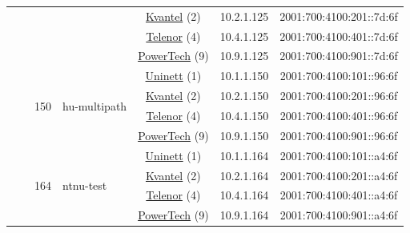 \begin{small}
\begin{center}
\begin{longtable}{|c|c|c|c|c|c|c|c|}
  &  &  &  & \multicolumn{2}{|c|}{\tiny{\href{http://kvantel.no}{Kvantel} (2)}} & \tiny{10.2.1.125} & \tiny{2001:700:4100:201::7d:6f} \\* \cline{5-5}\cline{6-6}\cline{7-7}\cline{8-8}
  &  &  &  & \multicolumn{2}{|c|}{\tiny{\href{https://www.telenor.no}{Telenor} (4)}} & \tiny{10.4.1.125} & \tiny{2001:700:4100:401::7d:6f} \\* \cline{5-5}\cline{6-6}\cline{7-7}\cline{8-8}
  &  &  &  & \multicolumn{2}{|c|}{\tiny{\href{http://www.powertech.no}{PowerTech} (9)}} & \tiny{10.9.1.125} & \tiny{2001:700:4100:901::7d:6f} \\* \cline{3-3}\cline{4-4}\cline{5-5}\cline{6-6}\cline{7-7}\cline{8-8}
  &  & \multirow{4}{*}{\tiny{150}} & \multicolumn{1}{|l|}{\multirow{4}{*}{\tiny{hu-multipath}}} & \multicolumn{2}{|c|}{\tiny{\href{https://www.uninett.no}{Uninett} (1)}} & \tiny{10.1.1.150} & \tiny{2001:700:4100:101::96:6f} \\* \cline{5-5}\cline{6-6}\cline{7-7}\cline{8-8}
  &  &  &  & \multicolumn{2}{|c|}{\tiny{\href{http://kvantel.no}{Kvantel} (2)}} & \tiny{10.2.1.150} & \tiny{2001:700:4100:201::96:6f} \\* \cline{5-5}\cline{6-6}\cline{7-7}\cline{8-8}
  &  &  &  & \multicolumn{2}{|c|}{\tiny{\href{https://www.telenor.no}{Telenor} (4)}} & \tiny{10.4.1.150} & \tiny{2001:700:4100:401::96:6f} \\* \cline{5-5}\cline{6-6}\cline{7-7}\cline{8-8}
  &  &  &  & \multicolumn{2}{|c|}{\tiny{\href{http://www.powertech.no}{PowerTech} (9)}} & \tiny{10.9.1.150} & \tiny{2001:700:4100:901::96:6f} \\* \cline{3-3}\cline{4-4}\cline{5-5}\cline{6-6}\cline{7-7}\cline{8-8}
  &  & \multirow{4}{*}{\tiny{164}} & \multicolumn{1}{|l|}{\multirow{4}{*}{\tiny{ntnu-test}}} & \multicolumn{2}{|c|}{\tiny{\href{https://www.uninett.no}{Uninett} (1)}} & \tiny{10.1.1.164} & \tiny{2001:700:4100:101::a4:6f} \\* \cline{5-5}\cline{6-6}\cline{7-7}\cline{8-8}
  &  &  &  & \multicolumn{2}{|c|}{\tiny{\href{http://kvantel.no}{Kvantel} (2)}} & \tiny{10.2.1.164} & \tiny{2001:700:4100:201::a4:6f} \\* \cline{5-5}\cline{6-6}\cline{7-7}\cline{8-8}
  &  &  &  & \multicolumn{2}{|c|}{\tiny{\href{https://www.telenor.no}{Telenor} (4)}} & \tiny{10.4.1.164} & \tiny{2001:700:4100:401::a4:6f} \\* \cline{5-5}\cline{6-6}\cline{7-7}\cline{8-8}
  &  &  &  & \multicolumn{2}{|c|}{\tiny{\href{http://www.powertech.no}{PowerTech} (9)}} & \tiny{10.9.1.164} & \tiny{2001:700:4100:901::a4:6f} \\* \cline{3-3}\cline{4-4}\cline{5-5}\cline{6-6}\cline{7-7}\cline{8-8}

\end{longtable}
\end{center}
\end{small}
